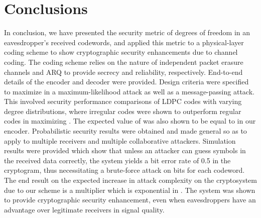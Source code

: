 \documentclass[10pt,twocolumn,twoside]{IEEEtran} \newlength{\pic}
\theoremstyle{definition}
\theoremstyle{remark}
\theoremstyle{plain}
\begin{document}
\section{Conclusions}\label{sec:conclusion}
In conclusion, we have presented the security metric of degrees of freedom  in an eavesdropper's received codewords, and applied this metric to a physical-layer coding scheme to show cryptographic security enhancements due to channel coding. The coding scheme relies on the nature of independent packet erasure channels and ARQ to provide secrecy and reliability, respectively. End-to-end details of the encoder and decoder were provided. Design criteria were specified to maximize  in a maximum-likelihood attack as well as a message-passing attack. This involved security performance comparisons of LDPC codes with varying degree distributions, where irregular codes were shown to outperform regular codes in maximizing . The expected value of  was also shown to be equal to  in our encoder. Probabilistic security results were obtained and made general so as to apply to multiple receivers and multiple collaborative attackers. Simulation results were provided which show that unless an attacker can guess  symbols in the received data correctly, the system yields a bit error rate of 0.5 in the cryptogram, thus necessitating a brute-force attack on  bits for each codeword. The end result on the expected increase in attack complexity on the cryptosystem due to our scheme is a multiplier which is exponential in . The system was shown to provide cryptographic security enhancement, even when eavesdroppers have an advantage over legitimate receivers in signal quality.






\ifCLASSOPTIONpeerreview
\pagebreak
\listoffigures
\listoftables
\fi
\end{document}
